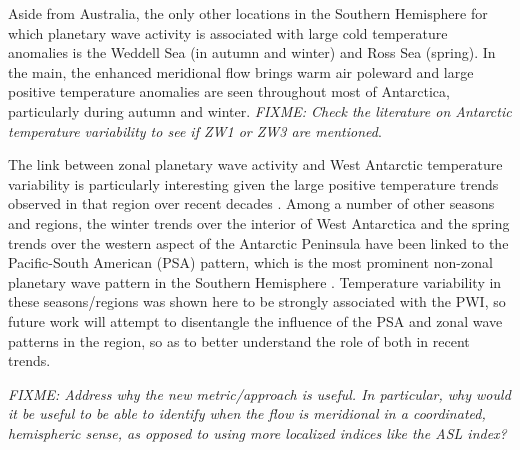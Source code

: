 Aside from Australia, the only other locations in the Southern Hemisphere for which planetary wave activity is associated with large cold temperature anomalies is the Weddell Sea (in autumn and winter) and Ross Sea (spring). In the main, the enhanced meridional flow brings warm air poleward and large positive temperature anomalies are seen throughout most of Antarctica, particularly during autumn and winter. \textit{FIXME: Check the literature on Antarctic temperature variability to see if ZW1 or ZW3 are mentioned}.

The link between zonal planetary wave activity and West Antarctic temperature variability is particularly interesting given the large positive temperature trends observed in that region over recent decades \citep[e.g.][]{Bromwich2013}. Among a number of other seasons and regions, the winter trends over the interior of West Antarctica \citep{Ding2011} and the spring trends over the western aspect of the Antarctic Peninsula \citep{Ding2013} have been linked to the Pacific-South American (PSA) pattern, which is the most prominent non-zonal planetary wave pattern in the Southern Hemisphere \citep[e.g.][]{Mo2001}. Temperature variability in these seasons/regions was shown here to be strongly associated with the PWI, so future work will attempt to disentangle the influence of the PSA and zonal wave patterns in the region, so as to better understand the role of both in recent trends.   

\textit{FIXME: Address why the new metric/approach is useful. In particular, why would it be useful to be able to identify when the flow is meridional in a coordinated, hemispheric sense, as opposed to using more localized indices like the ASL index?}

